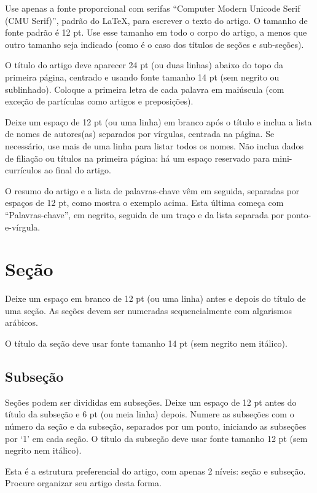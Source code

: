 \documentclass[
	article,			%
	12pt,				%
	oneside,			%
	a4paper,			%
	english,			%
	brazil,				%
	sumario=tradicional
	]{abntex2}
\begin{document}
	Use apenas a fonte proporcional com serifas “Computer Modern Unicode Serif (CMU Serif)”, padrão do LaTeX, para escrever o texto do artigo.  O tamanho de fonte padrão é 12 pt.  Use esse tamanho em todo o corpo do artigo, a menos que outro tamanho seja indicado (como é o caso dos títulos de seções e sub-seções).
    
	O título do artigo deve aparecer 24 pt (ou duas linhas) abaixo do topo da primeira página, centrado e usando fonte tamanho 14 pt (sem negrito ou sublinhado).  Coloque a primeira letra de cada palavra em maiúscula (com exceção de partículas como artigos e preposições).
    
	Deixe um espaço de 12 pt (ou uma linha) em branco após o título e inclua a lista de nomes de autores(as) separados por vírgulas, centrada na página.  Se necessário, use mais de uma linha para listar todos os nomes.  Não inclua dados de filiação ou títulos na primeira página: há um espaço reservado para mini-currículos ao final do artigo.
    
	O resumo do artigo e a lista de palavras-chave vêm em seguida, separadas por espaços de 12 pt, como mostra o exemplo acima.  Esta última começa com “Palavras-chave”, em negrito, seguida de um traço e da lista separada por ponto-e-vírgula.

\section{Seção}

Deixe um espaço em branco de 12 pt (ou uma linha) antes e depois do título de uma seção.  As seções devem ser numeradas sequencialmente com algarismos arábicos. 

O título da seção deve usar fonte tamanho 14 pt (sem negrito nem itálico).

\subsection{Subseção}

Seções podem ser divididas em subseções.  Deixe um espaço de 12 pt antes do título da subseção e 6 pt (ou meia linha) depois.  Numere as subseções com o número da seção e da subseção, separados por um ponto, iniciando as subseções por ‘1’ em cada seção.  O título da subseção deve usar fonte tamanho 12 pt (sem negrito nem itálico).

Esta é a estrutura preferencial do artigo, com apenas 2 níveis: seção e subseção.  Procure organizar seu artigo desta forma.
\end{document}

